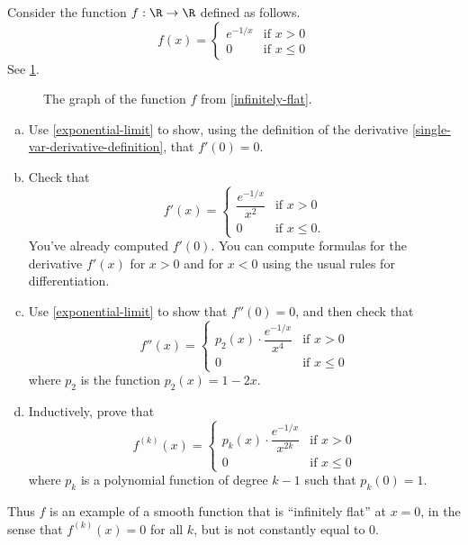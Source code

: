 \begin{exercise} \label{infinitely-flat}
	Consider the function $f : \R \to \R$ defined as follows.
	\[ f(x) = \begin{cases} e^{-1/x} & \text{if } x > 0 \\ 0 & \text{if } x \leq 0 \end{cases} \]
	See \cref{infinitely-flat-graph}. 
	\begin{figure}
		\begin{center}
		\end{center}
		\caption{The graph of the function $f$ from \cref{infinitely-flat}.}  \label{infinitely-flat-graph}
	\end{figure}
	\begin{enumerate}[(a)]
		\item Use \cref{exponential-limit} to show, using the definition of the derivative \ref{single-var-derivative-definition}, that $f'(0) = 0$.
		\item Check that
		\[ f'(x) = \begin{cases} \dfrac{e^{-1/x}}{x^2} & \text{if } x > 0 \\ 0 & \text{if } x \leq 0. \end{cases} \]
		You've already computed $f'(0)$. You can compute formulas for the derivative $f'(x)$ for $x > 0$ and for $x < 0$ using the usual rules for differentiation.
		\item Use \cref{exponential-limit} to show that $f''(0) = 0$, and then check that 
		\[ f''(x) = \begin{cases} p_2(x) \cdot \dfrac{e^{-1/x}}{x^4} & \text{if } x > 0 \\ 0 & \text{if } x \leq 0 \end{cases} \]
		where $p_2$ is the function $p_2(x) = 1-2x$. 
		\item Inductively, prove that
		\[ f^{(k)}(x) = \begin{cases} p_k(x) \cdot \dfrac{e^{-1/x}}{x^{2k}} & \text{if } x > 0 \\ 0 & \text{if } x \leq 0 \end{cases} \]
		where $p_k$ is a polynomial function of degree $k-1$ such that $p_k(0) = 1$. 
	\end{enumerate}
	Thus $f$ is an example of a smooth function that is ``infinitely flat'' at $x = 0$, in the sense that $f^{(k)}(x) = 0$ for all $k$, but is not constantly equal to 0. 
\end{exercise}

